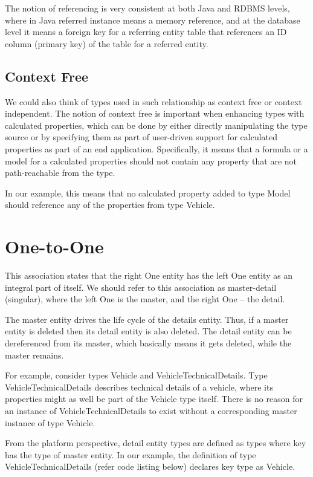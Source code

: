  The notion of referencing is very consistent at both Java and RDBMS levels, where in Java referred instance means a memory reference, and at the database level it means a foreign key for a referring entity table that references an ID column (primary key) of the table for a referred entity.

  \subsection{Context Free}

  We could also think of types used in such relationship as context free or context independent. The notion of context free is important when enhancing types with calculated properties, which can be done by either directly manipulating the type source or by specifying them as part of user-driven support for calculated properties as part of an end application. Specifically, it means that a formula or a model for a calculated properties should not contain any property that are not path-reachable from the type.

  In our example, this means that no calculated property added to type Model should reference any of the properties from type Vehicle.

\section{One-to-One}

  This association states that the right One entity has the left One entity as an integral part of itself. We should refer to this association as master-detail (singular), where the left One is the master, and the right One -- the detail.

  The master entity drives the life cycle of the details entity. Thus, if a master entity is deleted then its detail entity is also deleted. The detail entity can be dereferenced from its master, which basically means it gets deleted, while the master remains.

  For example, consider types Vehicle and VehicleTechnicalDetails. Type VehicleTechnicalDetails describes technical details of a vehicle, where its properties might as well be part of the Vehicle type itself. There is no reason for an instance of VehicleTechnicalDetails to exist without a corresponding master instance of type Vehicle.

  From the platform perspective, detail entity types are defined as types where key has the type of master entity. In our example, the definition of type VehicleTechnicalDetails (refer code listing below) declares key type as Vehicle.

